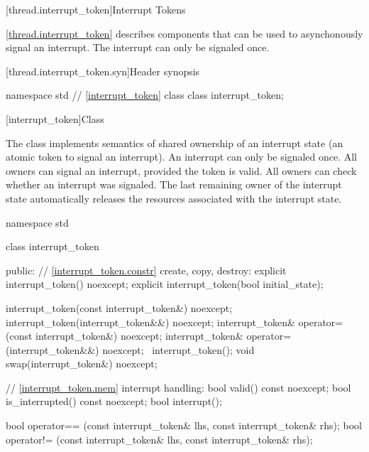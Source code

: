 {\color{insertcolor}

[thread.interrupt_token]{Interrupt Tokens}

\pnum
\ref{thread.interrupt_token} describes components that can be used to
asynchonously signal an interrupt.
The interrupt can only be signaled once.

[thread.interrupt_token.syn]{Header  synopsis}
%

\begin{codeblock}
namespace std {
  // \ref{interrupt_token} class 
  class interrupt_token;
}
\end{codeblock}


%
[interrupt_token]{Class }

\pnum
{}%
The class  implements semantics of shared ownership of an
interrupt state (an atomic token to signal an interrupt).
An interrupt can only be signaled once.
All owners can signal an interrupt, provided the token is valid.
All owners can check whether an interrupt was signaled.
The last remaining owner of the interrupt state automatically 
releases the resources associated with the interrupt state.

\begin{codeblock}
namespace std {
  class interrupt_token {
  public:
    // \ref{interrupt_token.constr} create, copy, destroy:
    explicit interrupt_token() noexcept;
    explicit interrupt_token(bool initial_state);

    interrupt_token(const interrupt_token&) noexcept;
    interrupt_token(interrupt_token&&) noexcept;
    interrupt_token& operator=(const interrupt_token&) noexcept;
    interrupt_token& operator=(interrupt_token&&) noexcept;
    ~interrupt_token();
    void swap(interrupt_token&) noexcept;

    // \ref{interrupt_token.mem} interrupt handling:
    bool valid() const noexcept;
    bool is_interrupted() const noexcept;
    bool interrupt();
  }
}

bool operator== (const interrupt_token& lhs, const interrupt_token& rhs);
bool operator!= (const interrupt_token& lhs, const interrupt_token& rhs);
\end{codeblock}

}
